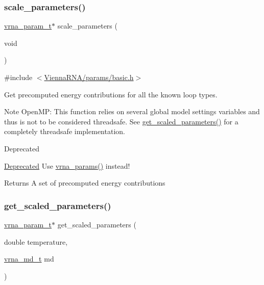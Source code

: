 \subsubsection{\texorpdfstring{scale\_parameters()}{scale\_parameters()}}
{\footnotesize\ttfamily \mbox{\hyperlink{group__energy__parameters_ga8a69ca7d787e4fd6079914f5343a1f35}{vrna\+\_\+param\+\_\+t}}$\ast$ scale\+\_\+parameters (\begin{DoxyParamCaption}\item[{void}]{ }\end{DoxyParamCaption})}



{\ttfamily \#include $<$\mbox{\hyperlink{params_2basic_8h}{Vienna\+R\+N\+A/params/basic.\+h}}$>$}



Get precomputed energy contributions for all the known loop types. 

\begin{DoxyNote}{Note}
Open\+MP\+: This function relies on several global model settings variables and thus is not to be considered threadsafe. See \mbox{\hyperlink{group__energy__parameters_ga7fa6a000d7c16feab939f2c4ee626197}{get\+\_\+scaled\+\_\+parameters()}} for a completely threadsafe implementation.
\end{DoxyNote}
\begin{DoxyRefDesc}{Deprecated}
\item[\mbox{\hyperlink{deprecated__deprecated000147}{Deprecated}}]Use \mbox{\hyperlink{group__energy__parameters_gad0e3e7e74bdc50d1709d40c92993185e}{vrna\+\_\+params()}} instead!\end{DoxyRefDesc}


\begin{DoxyReturn}{Returns}
A set of precomputed energy contributions 
\end{DoxyReturn}
\mbox{\label{group__energy__parameters_ga7fa6a000d7c16feab939f2c4ee626197}} 
\subsubsection{\texorpdfstring{get\_scaled\_parameters()}{get\_scaled\_parameters()}}
{\footnotesize\ttfamily \mbox{\hyperlink{group__energy__parameters_ga8a69ca7d787e4fd6079914f5343a1f35}{vrna\+\_\+param\+\_\+t}}$\ast$ get\+\_\+scaled\+\_\+parameters (\begin{DoxyParamCaption}\item[{double}]{temperature,  }\item[{\mbox{\hyperlink{group__model__details_ga1f8a10e12a0a1915f2a4eff0b28ea17c}{vrna\+\_\+md\+\_\+t}}}]{md }\end{DoxyParamCaption})}



